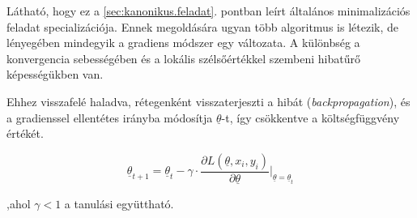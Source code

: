
%


Látható, hogy ez a \ref{sec:kanonikus.feladat}. pontban leírt általános minimalizációs feladat specializációja.
Ennek megoldására ugyan több algoritmus is létezik, de lényegében mindegyik a gradiens módszer egy változata.
A különbség a konvergencia sebességében és a lokális szélsőértékkel szembeni 
hibatűrő képességükben van.

Ehhez visszafelé haladva, rétegenként visszaterjeszti a hibát (\textit{backpropagation}),
és a gradienssel ellentétes irányba módosítja $ \underline{\theta} $-t, így csökkentve a költségfüggvény értékét.

\[ 
 \underline{\theta}_{t+1} = \underline{\theta}_t - \gamma \cdot \frac{\partial L(\underline{\theta}, x_i, y_i)}{\partial \underline{\theta}}\bigg\rvert_{\underline{\theta}=\underline{\theta}_t}
 \]

\noindent
,ahol $ \gamma < 1 $ a tanulási együttható.



%
%
%
%
%
%
%
%
%
%
%
%
%
%
%
%



